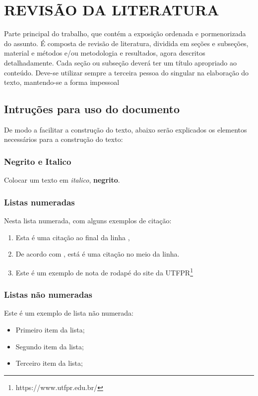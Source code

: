 \chapter{REVISÃO DA LITERATURA}\label{chp:REVISAO}

Parte principal do trabalho, que contém a exposição ordenada e pormenorizada do assunto. É composta de revisão de literatura, dividida em seções e subseções, material e métodos e/ou metodologia e resultados, agora descritos detalhadamente. Cada seção ou subseção deverá ter um título apropriado ao conteúdo.
Deve-se utilizar sempre a terceira pessoa do singular na elaboração do texto, mantendo-se a forma impessoal

\section{Intruções para uso do documento}

De modo a facilitar a construção do texto, abaixo serão explicados os elementos necessários para a construção do texto:

\subsection{Negrito e Italico}
Colocar um texto em \textit{italico}, \textbf{negrito}.

\subsection{Listas numeradas}
Nesta lista numerada, com alguns exemplos de citação:
\begin{enumerate}
    \item Esta é uma citação ao final da linha \cite{Pressman2011},
    \item De acordo com \textcite{Pressman2011}, está é uma citação no meio da linha.
    \item Este é um exemplo de nota de rodapé do site da UTFPR\footnote{https://www.utfpr.edu.br/}
\end{enumerate}

\subsection{Listas não numeradas}
Este é um exemplo de lista não numerada:
\begin{itemize}
    \item Primeiro item da lista;
    \item Segundo item da lista;
    \item Terceiro item da lista;
\end{itemize}

